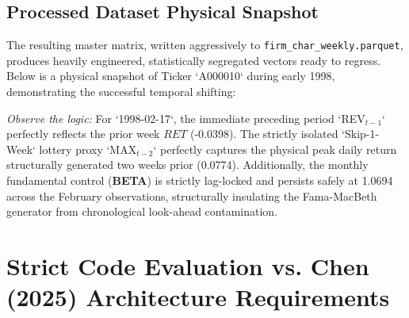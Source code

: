 \documentclass[11pt,a4paper]{article}
\begin{document}
\subsection{Processed Dataset Physical Snapshot}
The resulting master matrix, written aggressively to \texttt{firm\_char\_weekly.parquet}, produces heavily engineered, statistically segregated vectors ready to regress. Below is a physical snapshot of Ticker `A000010` during early 1998, demonstrating the successful temporal shifting:

\begin{table}[h]
\centering
{}
\end{table}

\textit{Observe the logic:} For `1998-02-17`, the immediate preceding period `REV$_{t-1}$` perfectly reflects the prior week $RET$ (-0.0398). The strictly isolated `Skip-1-Week` lottery proxy `MAX$_{t-2}$` perfectly captures the physical peak daily return structurally generated two weeks prior (0.0774). Additionally, the monthly fundamental control (\textbf{BETA}) is strictly lag-locked and persists safely at 1.0694 across the February observations, structurally insulating the Fama-MacBeth generator from chronological look-ahead contamination.

\section{Strict Code Evaluation vs. Chen (2025) Architecture Requirements}
\end{document}
